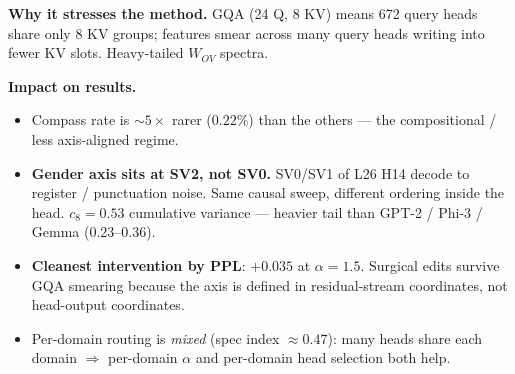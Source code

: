 \documentclass[11pt]{article}
\begin{document}
\hfill
\begin{minipage}[t]{0.245\linewidth}
\begin{tcolorbox}[modelbox, colframe=llamac, title={\textcolor{llamac}{Llama-3.2-3B} --- the compositional one}]
\textbf{Why it stresses the method.} GQA (24 Q, 8 KV) means 672 query heads
share only 8 KV groups; features smear across many query heads writing into
fewer KV slots. Heavy-tailed $W_{OV}$ spectra.

\textbf{Impact on results.}
\begin{itemize}
    \item Compass rate is $\sim 5\times$ rarer ($0.22\%$) than the others --- the compositional / less axis-aligned regime.
    \item \textbf{Gender axis sits at SV2, not SV0.} SV0/SV1 of L26 H14 decode to register / punctuation noise. Same causal sweep, different ordering inside the head. $c_8 = 0.53$ cumulative variance --- heavier tail than GPT-2 / Phi-3 / Gemma ($0.23$--$0.36$).
    \item \textbf{Cleanest intervention by PPL}: $+0.035$ at $\alpha{=}1.5$. Surgical edits survive GQA smearing because the axis is defined in residual-stream coordinates, not head-output coordinates.
    \item Per-domain routing is \emph{mixed} (spec index $\approx 0.47$): many heads share each domain $\Rightarrow$ per-domain $\alpha$ and per-domain head selection both help.
\end{itemize}
\end{tcolorbox}
\end{minipage}

\vspace{10pt}
\end{document}
